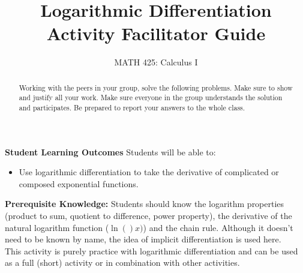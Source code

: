 \documentclass{ximera}
\title{Logarithmic Differentiation Activity Facilitator Guide}
\author{MATH 425: Calculus I}
\begin{document}
\begin{abstract}
   Working with the peers in your group, solve the following problems. Make sure to show and justify all your work. Make sure everyone in the group understands the solution and participates. Be prepared to report your answers to the whole class. 
\end{abstract}
\maketitle

\textbf{Student Learning Outcomes}
Students will be able to:
    \begin{itemize}
        \item Use logarithmic differentiation to take the derivative of complicated or composed exponential functions.
    \end{itemize}

\textbf{Prerequisite Knowledge:} Students should know the logarithm properties (product to sum, quotient to difference, power property), the derivative of the natural logarithm function ($\ln()x)$) and the chain rule.  Although it doesn't need to be known by name, the idea of implicit differentiation is used here.\\

This activity is purely practice with logarithmic differentiation and can be used as a full (short) activity or in combination with other activities.
\end{document}
